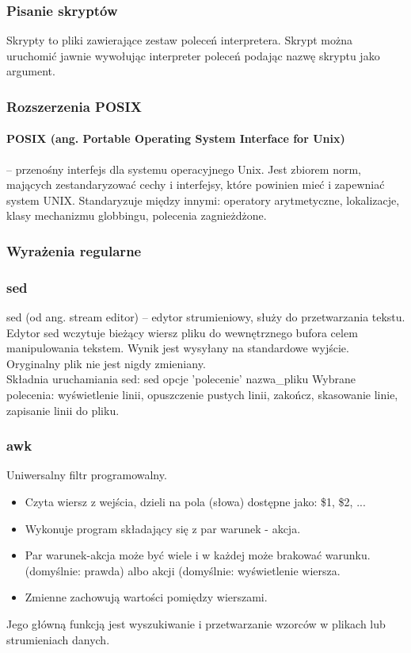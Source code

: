 \documentclass[a4paper,twoside]{report}
\begin{document}
\subsubsection{Pisanie skryptów}

Skrypty to pliki zawierające zestaw poleceń interpretera. Skrypt można uruchomić jawnie wywołując interpreter poleceń podając nazwę skryptu jako argument.


\subsubsection{Rozszerzenia POSIX}


\paragraph{POSIX (ang. Portable Operating System Interface for Unix)} – przenośny interfejs dla systemu operacyjnego Unix. Jest zbiorem norm, mających zestandaryzować cechy i interfejsy, które powinien mieć i zapewniać system UNIX. 
Standaryzuje między innymi: operatory arytmetyczne, lokalizacje, klasy mechanizmu globbingu, polecenia zagnieżdżone.


\subsubsection{Wyrażenia regularne}
\subsubsection{sed}

sed (od ang. stream editor) – edytor strumieniowy, służy do przetwarzania tekstu.
Edytor sed
wczytuje   bieżący   wiersz   pliku   do   wewnętrznego   bufora   celem
manipulowania   tekstem.   Wynik   jest   wysyłany   na   standardowe   wyjście.
Oryginalny plik nie jest nigdy zmieniany. 
\\
Składnia uruchamiania sed: sed 
opcje 'polecenie' nazwa\_pliku
Wybrane polecenia: wyświetlenie linii, opuszczenie pustych linii, zakończ, skasowanie linie, zapisanie linii do pliku.

\subsubsection{awk}

Uniwersalny filtr programowalny. 
\begin{itemize}
	\item Czyta wiersz z wejścia, dzieli na pola (słowa) dostępne jako: \$1, \$2, ...
	\item Wykonuje program składający się z par warunek - akcja.
	\item Par warunek-akcja może być wiele i w każdej może brakować warunku.
	(domyślnie: prawda) albo akcji (domyślnie: wyświetlenie wiersza.
	\item Zmienne zachowują wartości pomiędzy wierszami.
\end{itemize} 
Jego główną funkcją jest wyszukiwanie i przetwarzanie wzorców w plikach lub strumieniach danych.
\end{document}
